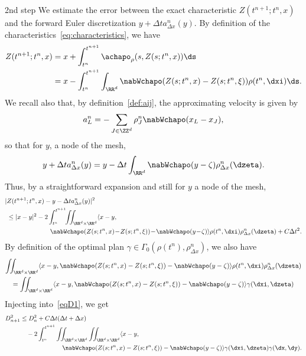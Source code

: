 \begin{step}{2nd step}
We estimate the error between the exact characteristic $Z(t^{n+1};t^n,x)$ and the forward Euler discretization $y+\Delta t a^n_{\Delta x}(y)$. By definition of the characteristics~\eqref{eq:characteristics}, we have
\begin{align*}
Z(t^{n+1};t^n,x) & = x + \int_{t^n}^{t^{n+1}} \achapo_\rho(s,Z(s;t^n,x)) \ds\\
& = x - \int_{t^n}^{t^{n+1}} \int_{\RR^d}\nabWchapo(Z(s;t^n,x)-Z(s;t^n,\xi)) \rho(t^n,\dxi) \ds.
\end{align*}
We recall also that, by definition~\eqref{def:aij}, the approximating velocity is given by
\begin{align*}
a_L^n = - \sum_{J\in\ZZ^d} \rho_J^n \nabWchapo(x_L-x_J),
\end{align*}
so that for $y$, a node of the mesh,
\begin{equation*}
y + \Delta t a^n_{\Delta x}(y) = y - \Delta t \int_{\RR^d}
\nabWchapo(y - \zeta) \rho^n_{\Delta x}(\dzeta ).
\end{equation*}
Thus, by a straightforward expansion and still for $y$ a node of the mesh,
\begin{align*}
&|Z(t^{n+1};t^n,x)-y-\Delta t a^n_{\Delta x}(y)|^2\\
&\;\leq |x-y|^2 - 2\int_{t^n}^{t^{n+1}}\!\!\iint_{\RR^d\times \RR^d} \langle x-y,\\
&\qquad\qquad\qquad\quad\nabWchapo(Z(s;t^n,x)\!-\!Z(s;t^n,\xi))\!-\!\nabWchapo(y\!-\!\zeta)\rangle \rho(t^n,\dxi) \rho_{\Delta x}^n(\dzeta) + C\Delta t^2.
\end{align*}
By definition of the optimal plan $\gamma\in \Gamma_0(\rho(t^n),\rho^n_{\Delta x})$, we also have
\begin{multline*}
\iint_{\RR^d\times \RR^d} \langle x-y, \nabWchapo(Z(s;t^n,x)-Z(s;t^n,\xi))-\nabWchapo(y-\zeta)\rangle \rho(t^n,\dxi) \rho_{\Delta x}^n(\dzeta) \\
= \iint_{\RR^d\times \RR^d} \langle x-y, \nabWchapo(Z(s;t^n,x)-Z(s;t^n,\xi))-\nabWchapo(y-\zeta)\rangle \gamma(\dxi,\dzeta)
\end{multline*}
Injecting into~\eqref{eqD1}, we get
\begin{align*}
D_{n+1}^2 &\leq D_n^2 + C \Delta t(\Delta t+\Delta x) \\
&\quad- 2 \int_{t^n}^{t^{n+1}}\iint_{\RR^d\times \RR^d}\iint_{\RR^d\times \RR^d} \langle x-y, \\
&\mkern 120mu\nabWchapo(Z(s;t^n,x)-Z(s;t^n,\xi))-\nabWchapo(y-\zeta) \rangle
\gamma(\dxi,\dzeta) \gamma(\dx,\dy).

\end{align*}
\end{step}
